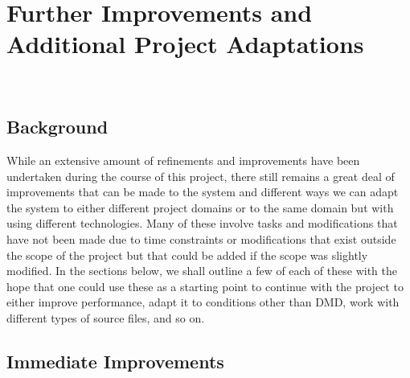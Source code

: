 \documentclass[12pt,twoside]{report}
\begin{document}
\chapter{Further Improvements and Additional Project Adaptations\\~\\}

\section{Background}

\quad While an extensive amount of refinements and improvements have been undertaken during the course of this project, there still remains a great deal of improvements that can be made to the system and different ways we can adapt the system to either different project domains or to the same domain but with using different technologies. Many of these involve tasks and modifications that have not been made due to time constraints or modifications that exist outside the scope of the project but that could be added if the scope was slightly modified. In the sections below, we shall outline a few of each of these with the hope that one could use these as a starting point to continue with the project to either improve performance, adapt it to conditions other than DMD, work with different types of source files, and so on.

\section{Immediate Improvements}

\end{document}
